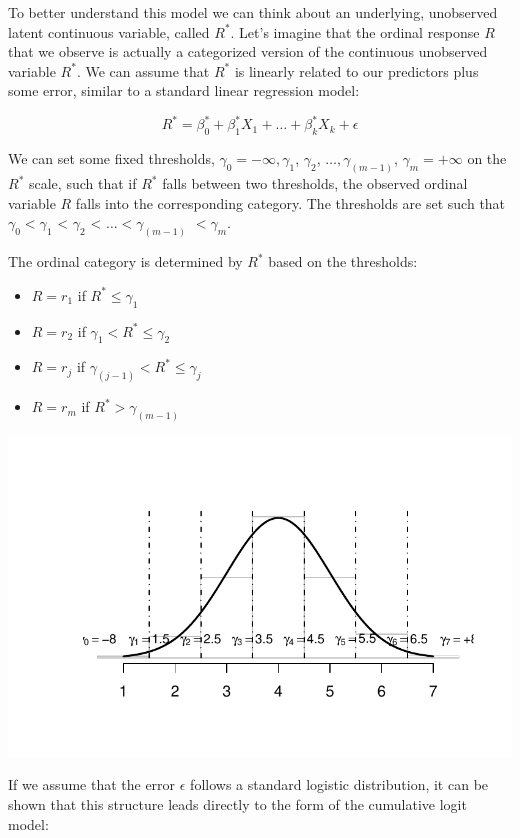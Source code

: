 \documentclass[
  letterpaper,
  DIV=11,
  numbers=noendperiod]{scrartcl}
\providecommand{\tightlist}{%
  \setlength{\itemsep}{0pt}\setlength{\parskip}{0pt}}\usepackage{longtable,booktabs,array}
\begin{document}
To better understand this model we can think about an underlying,
unobserved latent continuous variable, called \(R^*\). Let's imagine
that the ordinal response \(R\) that we observe is actually a
categorized version of the continuous unobserved variable \(R^*\). We
can assume that \(R^*\) is linearly related to our predictors plus some
error, similar to a standard linear regression model:

\[
R^* = \beta_0^* + \beta_1^*X_1 + \dots + \beta_k^*X_k + \epsilon
\]

We can set some fixed thresholds, \(\gamma_0 = -\infty, \gamma_1\),
\(\gamma_2\), \(\dots, \gamma_{(m-1)}\), \(\gamma_m = +\infty\) on the
\(R^*\) scale, such that if \(R^*\) falls between two thresholds, the
observed ordinal variable \(R\) falls into the corresponding category.
The thresholds are set such that \(\gamma_0 < \gamma_1\) \textless{}
\(\gamma_2\) \textless{} \(\dots < \gamma_{(m-1)}\) \(<\gamma_m\).

The ordinal category is determined by \(R^*\) based on the thresholds:

\begin{itemize}
\tightlist
\item
  \(R = r_1\) if \(R^* \leq \gamma_1\)
\item
  \(R = r_2\) if \(\gamma_1 < R^* \leq \gamma_2\)
\item
  \(R = r_j\) if \(\gamma_{(j-1)} < R^* \leq \gamma_j\)
\item
  \(R = r_m\) if \(R^* > \gamma_{(m-1)}\)
\end{itemize}

\includegraphics{Ordinal_data_an_R_files/figure-pdf/unnamed-chunk-8-1.pdf}

If we assume that the error \(\epsilon\) follows a standard logistic
distribution, it can be shown that this structure leads directly to the
form of the cumulative logit model:
\end{document}
